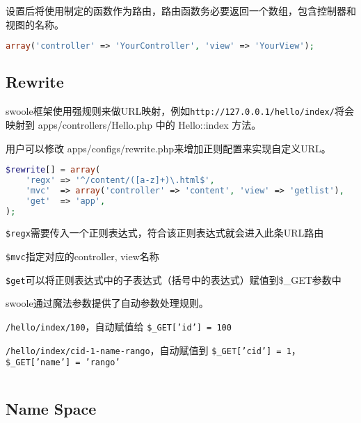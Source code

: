 设置后将使用制定的函数作为路由，路由函数务必要返回一个数组，包含控制器和视图的名称。

\begin{lstlisting}[language=PHP]
array('controller' => 'YourController', 'view' => 'YourView');
\end{lstlisting}



\subsection{Rewrite}


swoole框架使用强规则来做URL映射，例如\texttt{http://127.0.0.1/hello/index/}将会映射到 apps/controllers/Hello.php 中的 Hello::index 方法。

用户可以修改 apps/configs/rewrite.php来增加正则配置来实现自定义URL。





\begin{lstlisting}[language=PHP]
$rewrite[] = array(
    'regx' => '^/content/([a-z]+)\.html$',
    'mvc'  => array('controller' => 'content', 'view' => 'getlist'),
    'get'  => 'app',
);
\end{lstlisting}

\begin{compactitem}
\item \texttt{\$regx}需要传入一个正则表达式，符合该正则表达式就会进入此条URL路由
\item \texttt{\$mvc}指定对应的controller, view名称
\item \texttt{\$get}可以将正则表达式中的子表达式（括号中的表达式）赋值到\$\_GET参数中
\end{compactitem}

swoole通过魔法参数提供了自动参数处理规则。

\begin{compactitem}
\item \texttt{/hello/index/100}，自动赋值给 \texttt{\$\_GET['id'] = 100}
\item \texttt{/hello/index/cid-1-name-rango}，自动赋值到 \texttt{\$\_GET['cid'] = 1}， \texttt{\$\_GET['name'] = 'rango'}
\end{compactitem}

\begin{lstlisting}[language=PHP]

\end{lstlisting}




\subsection{Name Space}


